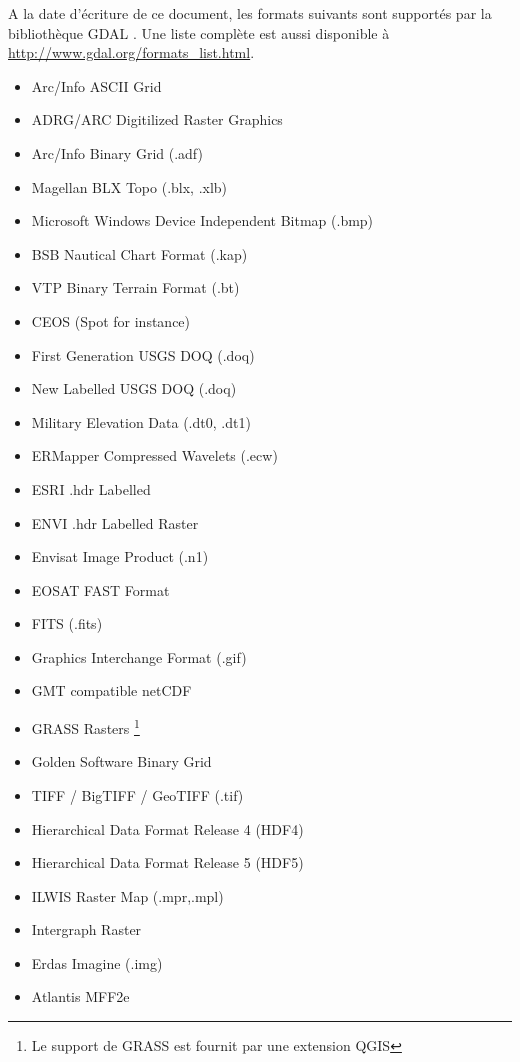 A la date d'écriture de ce document, les formats suivants sont supportés par la bibliothèque GDAL \cite{GDALweb}. Une liste complète est aussi disponible à \url{http://www.gdal.org/formats_list.html}.
 
\begin{itemize}
\item Arc/Info ASCII Grid
\item ADRG/ARC Digitilized Raster Graphics 
\item Arc/Info Binary Grid (.adf)
\item Magellan BLX Topo (.blx, .xlb)
\item Microsoft Windows Device Independent Bitmap (.bmp)
\item BSB Nautical Chart Format (.kap)
\item VTP Binary Terrain Format (.bt)
\item CEOS (Spot for instance)
\item First Generation USGS DOQ (.doq)
\item New Labelled USGS DOQ (.doq)
\item Military Elevation Data (.dt0, .dt1)
\item ERMapper Compressed Wavelets (.ecw)
\item ESRI .hdr Labelled
\item ENVI .hdr Labelled Raster
\item Envisat Image Product (.n1)
\item EOSAT FAST Format
\item FITS (.fits)
\item Graphics Interchange Format (.gif)
\item GMT compatible netCDF
\item GRASS Rasters \footnote{Le support de GRASS est fournit par une extension QGIS}
\item Golden Software Binary Grid
\item TIFF / BigTIFF / GeoTIFF (.tif)
\item Hierarchical Data Format Release 4 (HDF4)
\item Hierarchical Data Format Release 5 (HDF5)
\item ILWIS Raster Map (.mpr,.mpl)
\item Intergraph Raster
\item Erdas Imagine (.img)
\item Atlantis MFF2e

\end{itemize}

